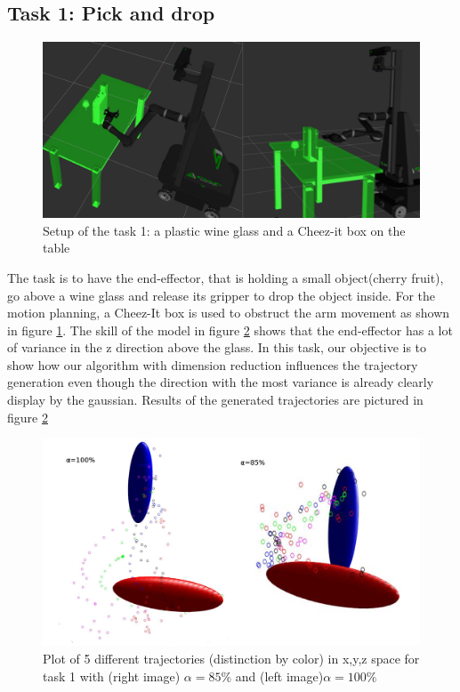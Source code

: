 \documentclass[letterpaper, 10 pt, conference]{ieeeconf}  %
\begin{document}
\subsection{Task 1: Pick and drop}
\begin{figure}[h]
	\centering
	\includegraphics[scale=0.22]{figure/task1Scenario.png}
	\caption{Setup of the task 1: a plastic wine glass and a Cheez-it box on the table}
	\label{task1Scenario}
\end{figure}
The task is to have the end-effector, that is holding a small object(cherry fruit), go above a wine glass and release its gripper to drop the object inside. For the motion planning, a Cheez-It box is used to obstruct the arm movement as shown in figure \ref{task1Scenario}. The skill of the model in figure \ref{trajectoriesTask1} shows that the end-effector has a lot of variance in the z direction above the glass. In this task, our objective is to show how our algorithm with dimension reduction influences the trajectory generation even though the direction with the most variance is already clearly display by the gaussian. Results of the generated trajectories are pictured in figure \ref{trajectoriesTask1} \\
\begin{figure}[h]
	\centering
	\includegraphics[scale=0.16]{figure/plotMixedTask1.png}
	\caption{Plot of 5 different trajectories (distinction by color) in x,y,z space for task 1 with (right image) $\alpha = 85\%$ and (left image)$\alpha = 100\%$ }
	\label{trajectoriesTask1}
\end{figure}
\end{document}
